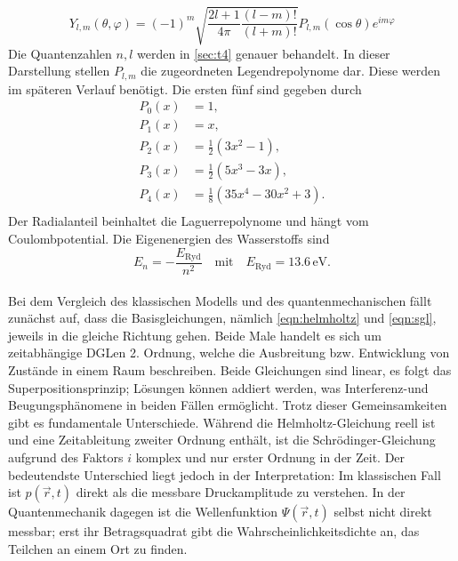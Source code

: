 \begin{equation}
    Y_{l,m}(\theta, \varphi) = (-1)^m \sqrt{\frac{2l+1}{4 \pi} \frac{(l-m)!}{(l+m)!}} P_{l,m}( \cos \theta) e^{im \varphi}
\end{equation}
Die Quantenzahlen $n,l$ werden in \autoref{sec:t4} genauer behandelt.
In dieser Darstellung stellen $P_{l,m}$ die zugeordneten Legendrepolynome dar. 
Diese werden im späteren Verlauf benötigt. Die ersten fünf sind gegeben durch 
\cite{kugelffktn}
\begin{align}
    P_0(x) &= 1, \\
    P_1(x) &= x, \\
    P_2(x) &= \frac{1}{2} (3x^2 -1), \\
    P_3(x) &= \frac{1}{2} (5x^3 - 3x), \\
    P_4(x) &= \frac{1}{8} (35x^4 - 30x^2 +3). \\
\end{align}
Der Radialanteil beinhaltet die Laguerrepolynome und hängt vom Coulombpotential.
Die Eigenenergien des Wasserstoffs sind 
\begin{equation*}
    E_n = -\frac{E_\text{Ryd}}{n^2} \quad \text{mit} \quad E_\text{Ryd} = 13{.}6\,\text{eV}.
\end{equation*}
\vspace{0.5em} \\
\noindent Bei dem Vergleich des klassischen Modells und des quantenmechanischen 
fällt zunächst auf, dass die Basisgleichungen, nämlich \autoref{eqn:helmholtz}
und \autoref{eqn:sgl}, jeweils in die gleiche Richtung gehen. Beide Male handelt 
es sich um zeitabhängige DGLen 2. Ordnung, welche die Ausbreitung bzw. Entwicklung 
von Zustände in einem Raum beschreiben. Beide Gleichungen sind linear, es folgt 
das Superpositionsprinzip; Lösungen können addiert werden, was Interferenz-und 
Beugungsphänomene in beiden Fällen ermöglicht. 
Trotz dieser Gemeinsamkeiten gibt es fundamentale Unterschiede. Während die
Helmholtz-Gleichung reell ist und eine Zeitableitung zweiter Ordnung enthält,
ist die Schrödinger-Gleichung aufgrund des Faktors $i$ komplex und nur erster
Ordnung in der Zeit. Der bedeutendste Unterschied liegt jedoch in der 
Interpretation: Im klassischen Fall ist $p(\vec{r},t)$ direkt als die messbare
Druckamplitude zu verstehen. In der Quantenmechanik dagegen ist die 
Wellenfunktion $\Psi(\vec{r},t)$ selbst nicht direkt messbar; erst ihr
Betragsquadrat gibt die Wahrscheinlichkeitsdichte an, das Teilchen an einem
Ort zu finden.
\vspace{0.5em} \\
